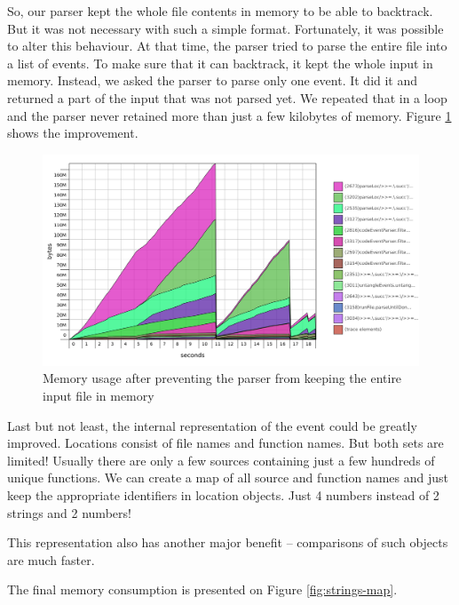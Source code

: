 So, our parser kept the whole file contents in memory to be able to backtrack. But it was not necessary with
such a simple format. Fortunately, it was possible to alter this behaviour.
At that time, the parser tried to parse the entire file into a list of events. To make sure that it can backtrack,
it kept the whole input in memory. Instead, we asked the parser to parse only one event. 
It did it and returned a part of the input that was not parsed yet. We repeated that in a loop
and the parser never retained more than just a few kilobytes of memory. 
Figure \ref{fig:single-event} shows the improvement.

\begin{figure}[hbt!]
 \centering
 \includegraphics[width=\textwidth]{png/single-event}
 \caption{Memory usage after preventing the parser from keeping the entire input file in memory}
 \label{fig:single-event}
\end{figure}

Last but not least, the internal representation of the event could be greatly improved.
Locations consist of file names and function names. But both sets are limited!
Usually there are only a few sources containing just a few hundreds of unique functions. 
We can create a map of all source and function names and just keep the appropriate identifiers in location objects.
Just 4 numbers instead of 2 strings and 2 numbers!

This representation also has another major benefit -- comparisons of such objects are much faster.

The final memory consumption is presented on Figure \ref{fig:strings-map}.

